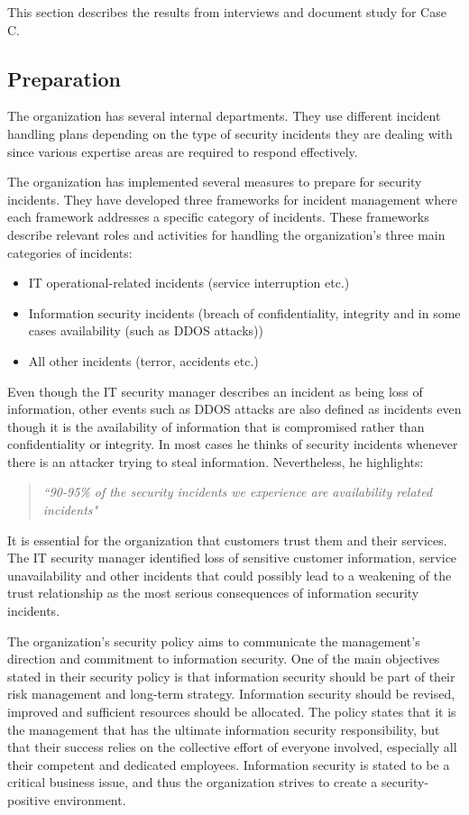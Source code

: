This section describes the results from interviews and document study for Case C.

\subsection{Preparation}
The organization has several internal departments. They use different incident handling plans depending on the type of security incidents they are dealing with since various expertise areas are required to respond effectively. 

The organization has implemented several measures to prepare for security incidents. They have developed three frameworks for incident management where each framework addresses a specific category of incidents. These frameworks describe relevant roles and activities for handling the organization's three main categories of incidents:

\begin{itemize}
\item IT operational-related incidents (service interruption etc.)
\item Information security incidents (breach of confidentiality, integrity and in some cases availability (such as DDOS attacks))
\item All other incidents (terror, accidents etc.)
\end{itemize}
 
Even though the IT security manager describes an incident as being loss of information, other events such as DDOS attacks are also defined as incidents even though it is the availability of information that is compromised rather than confidentiality or integrity. In most cases he thinks of security incidents whenever there is an attacker trying to steal information. Nevertheless, he highlights:

\begin{quote}
\textit{``90-95\% of the security incidents we experience are availability related incidents"}
\end{quote} 
 
It is essential for the organization that customers trust them and their services. The IT security manager identified loss of sensitive customer information, service unavailability and other incidents that could possibly lead to a weakening of the trust relationship as the most serious consequences of information security incidents. 

The organization's security policy aims to communicate the management's direction and commitment to information security. One of the main objectives stated in their security policy is that information security should be part of their risk management and long-term strategy. Information security should be revised, improved and sufficient resources should be allocated. The policy states that it is the management that has the ultimate information security responsibility, but that their success relies on the collective effort of everyone involved, especially all their competent and dedicated employees. Information security is stated to be a critical business issue, and thus the organization strives to create a security-positive environment.

